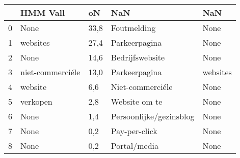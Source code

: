 \begin{tabular}{lllll}
\toprule
{} &          HMM Vall &    oN &                      NaN &       NaN \\
\midrule
0 &              None &  33,8 &              Foutmelding &      None \\
1 &          websites &  27,4 &            Parkeerpagina &      None \\
2 &              None &  14,6 &          Bedrijfswebsite &      None \\
3 &  niet-commerciéle &  13,0 &            Parkeerpagina &  websites \\
4 &           website &   6,6 &         Niet-commerciéle &      None \\
5 &          verkopen &   2,8 &            Website om te &      None \\
6 &              None &   1,4 &  Persoonlijke/gezinsblog &      None \\
7 &              None &   0,2 &            Pay-per-click &      None \\
8 &              None &   0,2 &             Portal/media &      None \\
\bottomrule
\end{tabular}
